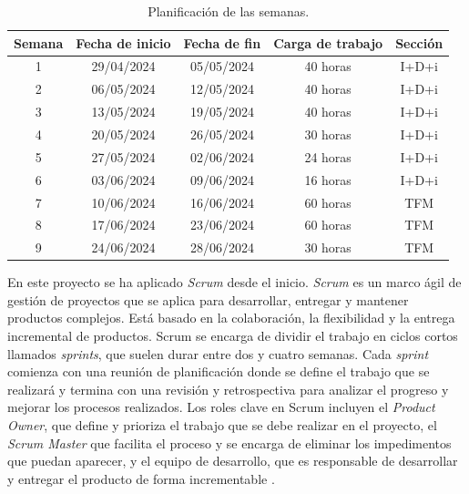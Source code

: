 \begin{table}[]
    \centering
    \begin{tabular}{|c|c|c|c|c|}
        \hline
        { \textbf{Semana}} & { \textbf{Fecha de inicio}} & { \textbf{Fecha de fin}} & { \textbf{Carga de trabajo}} & { \textbf{Sección}} \\ \hline
        1                  & 29/04/2024                  & 05/05/2024               & 40 horas                     & I+D+i               \\ \hline
        2                  & 06/05/2024                  & 12/05/2024               & 40 horas                     & I+D+i               \\ \hline
        3                  & 13/05/2024                  & 19/05/2024               & 40 horas                     & I+D+i               \\ \hline
        4                  & 20/05/2024                  & 26/05/2024               & 30 horas                     & I+D+i               \\ \hline
        5                  & 27/05/2024                  & 02/06/2024               & 24 horas                     & I+D+i               \\ \hline
        6                  & 03/06/2024                  & 09/06/2024               & 16 horas                     & I+D+i               \\ \hline
        7                  & 10/06/2024                  & 16/06/2024               & 60 horas                     & TFM                 \\ \hline
        8                  & 17/06/2024                  & 23/06/2024               & 60 horas                     & TFM                 \\ \hline
        9                  & 24/06/2024                  & 28/06/2024               & 30 horas                     & TFM                 \\ \hline
    \end{tabular}
    \caption{Planificación de las semanas.}
    \label{table:planificacion}
\end{table}

En este proyecto se ha aplicado \textit{Scrum} desde el inicio. \textit{Scrum} es un marco ágil de gestión de proyectos que se aplica para desarrollar, entregar y mantener productos complejos. Está basado en la colaboración, la flexibilidad y la entrega incremental de productos. Scrum se encarga de dividir el trabajo en ciclos cortos llamados \textit{sprints}, que suelen durar entre dos y cuatro semanas. Cada \textit{sprint} comienza con una reunión de planificación donde se define el trabajo que se realizará y termina con una revisión y retrospectiva para analizar el progreso y mejorar los procesos realizados. Los roles clave en Scrum incluyen el \textit{Product Owner}, que define y prioriza el trabajo que se debe realizar en el proyecto, el \textit{Scrum Master} que facilita el proceso y se encarga de eliminar los impedimentos que puedan aparecer, y el equipo de desarrollo, que es responsable de desarrollar y entregar el producto de forma incrementable \cite{scrum}.


